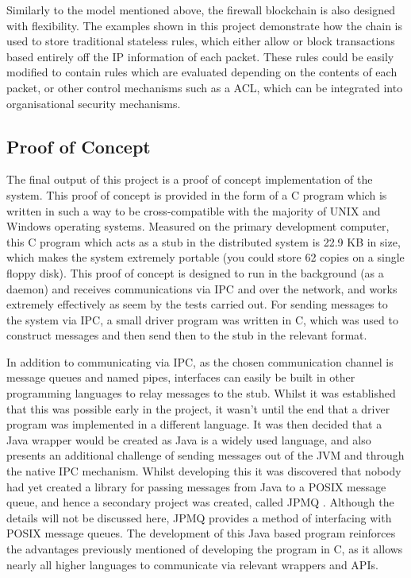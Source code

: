 \documentclass[a4paper, 11pt]{report}
\begin{document}
Similarly to the model mentioned above, the firewall \gls{blockchain} is also designed with flexibility. The examples shown in this project demonstrate how the chain is used to store traditional stateless rules, which either allow or block transactions based entirely off the \acrshort{IP} information of each packet. These rules could be easily modified to contain rules which are evaluated depending on the contents of each packet, or other control mechanisms such as a \acrfull{ACL}, which can be integrated into organisational security mechanisms.

\subsection{Proof of Concept}
The final output of this project is a proof of concept implementation of the system. This proof of concept is provided in the form of a C program which is written in such a way to be cross-compatible with the majority of UNIX and Windows operating systems. Measured on the primary development computer, this C program which acts as a \gls{stub} in the distributed system is 22.9 KB in size, which makes the system extremely portable (you could store 62 copies on a single floppy disk). This proof of concept is designed to run in the background (as a daemon) and receives communications via \acrshort{IPC} and over the network, and works extremely effectively as seem by the tests carried out. For sending messages to the system via \acrshort{IPC}, a small driver program was written in C, which was used to construct messages and then send then to the \gls{stub} in the relevant format.

In addition to communicating via \acrshort{IPC}, as the chosen communication channel is message queues and named pipes, interfaces can easily be built in other programming languages to relay messages to the \gls{stub}. Whilst it was established that this was possible early in the project, it wasn't until the end that a driver program was implemented in a different language. It was then decided that a Java wrapper would be created as Java is a widely used language, and also presents an additional challenge of sending messages out of the JVM and through the native \acrshort{IPC} mechanism. Whilst developing this it was discovered that nobody had yet created a library for passing messages from Java to a POSIX message queue, and hence a secondary project was created, called JPMQ \cite{jpmq}. Although the details will not be discussed here, JPMQ provides a method of interfacing with \acrshort{POSIX} message queues. The development of this Java based program reinforces the advantages previously mentioned of developing the program in C, as it allows nearly all higher languages to communicate via relevant wrappers and \acrshort{API}s.
\end{document}
